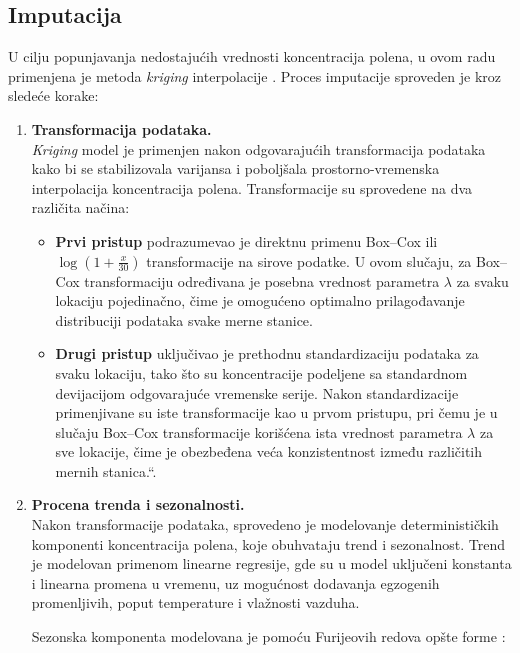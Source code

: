 \documentclass[12pt]{article}
\begin{document}
\subsection{Imputacija}

U cilju popunjavanja nedostajućih vrednosti koncentracija polena, u ovom radu primenjena je metoda \textit{kriging} interpolacije \cite{cressie1993statistics, chiles2009geostatistics}. Proces imputacije sproveden je kroz sledeće korake:

\begin{enumerate}
    \item \textbf{Transformacija podataka.} \\
    \textit{Kriging} model je primenjen nakon odgovarajućih transformacija podataka kako bi se stabilizovala varijansa i poboljšala prostorno-vremenska interpolacija koncentracija polena. Transformacije su sprovedene na dva različita načina:

    \begin{itemize}
        \item \textbf{Prvi pristup} podrazumevao je direktnu primenu Box–Cox ili $\log(1 + \frac{x}{30})$ transformacije na sirove podatke. U ovom slučaju, za Box–Cox transformaciju određivana je posebna vrednost parametra $\lambda$ za svaku lokaciju pojedinačno, čime je omogućeno optimalno prilagođavanje distribuciji podataka svake merne stanice.

        \item \textbf{Drugi pristup} uključivao je prethodnu standardizaciju podataka za svaku lokaciju, tako što su koncentracije podeljene sa standardnom devijacijom odgovarajuće vremenske serije. Nakon standardizacije primenjivane su iste transformacije kao u prvom pristupu, pri čemu je u slučaju Box–Cox transformacije korišćena ista vrednost parametra $\lambda$ za sve lokacije, čime je obezbeđena veća konzistentnost između različitih mernih stanica.“.
    \end{itemize}

    \item \textbf{Procena trenda i sezonalnosti.} \\
    Nakon transformacije podataka, sprovedeno je modelovanje determinističkih komponenti koncentracija polena, koje obuhvataju trend i sezonalnost. Trend je modelovan primenom linearne regresije, gde su u model uključeni konstanta  i linearna promena u vremenu, uz mogućnost dodavanja egzogenih promenljivih, poput temperature i vlažnosti vazduha.

    Sezonska komponenta modelovana je pomoću Furijeovih redova opšte forme \cite{hyndman2018forecasting}:


\end{enumerate}
\end{document}
